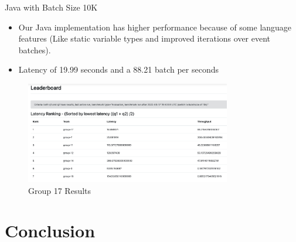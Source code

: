 \documentclass[9pt]{beamer}
\begin{document}
\begin{frame}[fragile]{Java with Batch Size 10K  }
    \begin{itemize}
        \item Our Java implementation has higher performance because of some language features (Like static variable types and improved iterations over event batches).
        \item Latency of 19.99 seconds and a 88.21 batch per seconds
    \end{itemize}

    

    
    \begin{figure}[]
        \begin{center}
            \includegraphics[width=0.8\textwidth]{../DEBS2022-2022-05-28-Throuput.png}
            \caption{Group 17 Results }
            \label{fig:evaluation}
        \end{center}
    \end{figure}
    
\end{frame}





\section{Conclusion}




\end{document}
